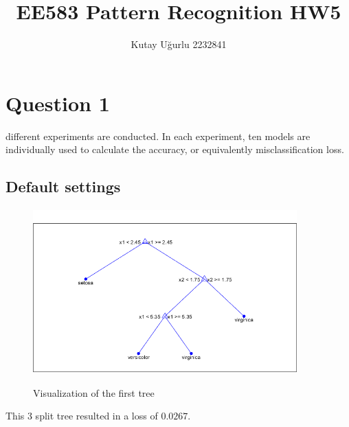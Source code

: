 \documentclass[11pt]{extarticle}
\author{Kutay U\u{g}urlu 2232841}
\begin{document}

\fancyfoot[C]{\thepage}
\title{\LARGE \LARGE EE583 Pattern Recognition HW5}

\maketitle{\LARGE}

\pagebreak


\section{Question 1}

 different experiments are conducted. In each experiment, ten models are individually used to calculate the accuracy, or equivalently misclassification loss. 

\subsection{Default settings}
\vspace*{-.5cm}
\begin{center}
    \begin{figure}[h]
        {\includegraphics[width = 4in, height = 2.5in]{QT_default.png}}
        \caption{Visualization of the first tree}
        \label{fig:q1_tree}
    \end{figure}
\end{center}
\vspace*{-1cm}
This 3 split tree resulted in a loss of $0.0267$.
\end{document}
